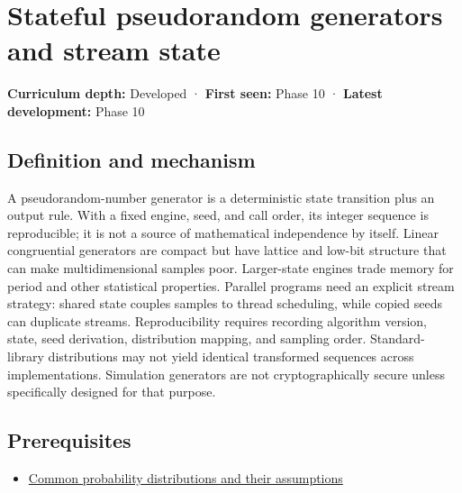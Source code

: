 \hypertarget{appendix-e0f7c7e08f3a}{}\label{referencestart:appendix-e0f7c7e08f3a}
\section{Stateful pseudorandom generators and stream state}\label{appendix-e0f7c7e08f3a-stateful-pseudorandom-generators-and-stream-state}

\textbf{Curriculum depth:} Developed · \textbf{First seen:} Phase 10 · \textbf{Latest development:} Phase 10

\begin{allmightroledefinition}

\subsection{Definition and mechanism}\label{appendix-e0f7c7e08f3a-definition-and-mechanism}

A pseudorandom-number generator is a deterministic state transition plus an output rule. With a fixed engine, seed, and call order, its integer sequence is reproducible; it is not a source of mathematical independence by itself. Linear congruential generators are compact but have lattice and low-bit structure that can make multidimensional samples poor. Larger-state engines trade memory for period and other statistical properties. Parallel programs need an explicit stream strategy: shared state couples samples to thread scheduling, while copied seeds can duplicate streams. Reproducibility requires recording algorithm version, state, seed derivation, distribution mapping, and sampling order. Standard-library distributions may not yield identical transformed sequences across implementations. Simulation generators are not cryptographically secure unless specifically designed for that purpose.

\end{allmightroledefinition}

\subsection{Prerequisites}\label{appendix-e0f7c7e08f3a-prerequisites}

\begin{itemize}
\tightlist
\item
  \hyperref[appendix-a2360b435383]{Common probability distributions and their assumptions}
\end{itemize}

